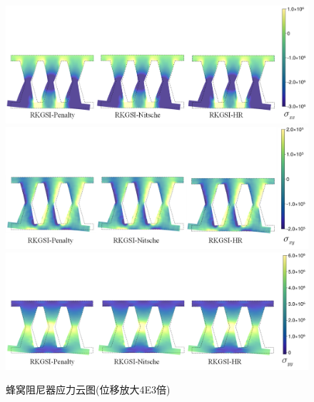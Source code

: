 \begin{figure}[H]
    \centering
        \includegraphics[scale=0.5]{figure/DAMPER/Honeycomb/M11.png}
        \includegraphics[scale=0.5]{figure/DAMPER/Honeycomb/M12.png}
        \includegraphics[scale=0.5]{figure/DAMPER/Honeycomb/M22.png}
    \caption{蜂窝阻尼器应力云图(位移放大4E3倍)}\label{HoneycombM}
\end{figure}
